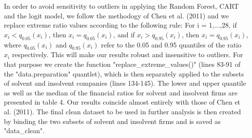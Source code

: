 \documentclass{article}
\begin{document}
 In order to avoid sensitivity to outliers in applying the Random Forest, CART and the logit model, we follow the methodogy of Chen et al. (2011) and we replace extreme ratio values according to the following rule: For i = 1,...,28, if $x_i<q_{0.05}(x_i)$, then $x_i=q_{0.05}(x_i)$, and if $x_i>q_{0.95}(x_i)$, then $x_i=q_{0.95}(x_i)$, where $q_{0.05}(x_i)$ and $q_{0.95}(x_i)$ refer to the 0.05 and 0.95 quantiles of the ratio $x_i$ respectively. This will make our results robust and insensitive to outliers. For that purpose we create the function "replace\_extreme\_values()" (lines 83-91 of the "data.preparation" quantlet), which is then separately applied to the subsets of solvent and insolvent companies (lines 134-145). The lower and upper quantile as well as the median of the financial ratios for solvent and insolvent firms are presented in table 4. Our results coincide almost entirely with those of Chen et al. (2011).  The final clean dataset to be used in further analysis is then created by binding the two subsets of solvent and insolvent firms and is saved as "data\_clean".
\end{document}

